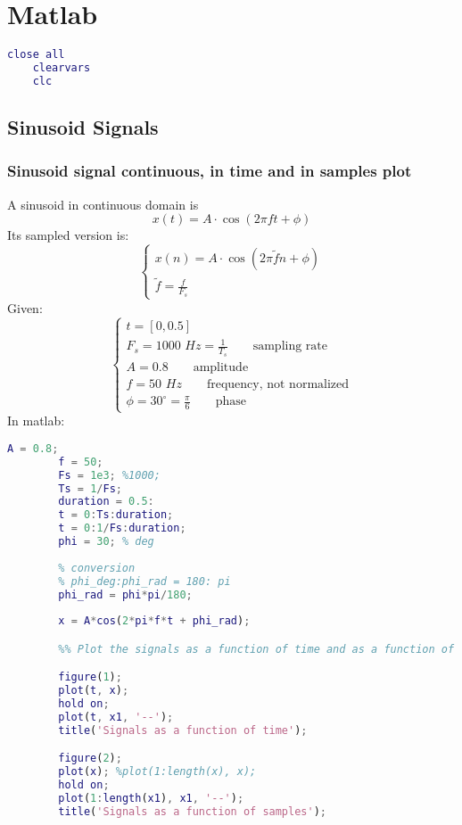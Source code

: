 
\section{Matlab}

\begin{lstlisting}[language=Matlab, escapeinside=`']
    close all
    clearvars
    clc
\end{lstlisting}

\subsection{Sinusoid Signals}

    \subsubsection{Sinusoid signal continuous, in time and in samples plot}
    A sinusoid in continuous domain is
    $$
    x(t)=A\cdot\cos(2\pi ft+\phi)
    $$
    Its sampled version is:
    $$
    \begin{cases}
        x(n)=A\cdot\cos(2\pi \tilde{f}n+\phi)\\
        \tilde{f}=\frac{f}{F_s}
    \end{cases}
    $$
    Given:
    $$
    \begin{cases}
        t=[0,0.5]\\
        F_s=1000\,\,Hz=\frac{1}{T_s}\qquad\text{sampling rate}\\
        A=0.8\qquad\text{amplitude}\\
        f=50\,\,Hz\qquad\text{frequency, not normalized}\\
        \phi=30^\circ=\frac{\pi}{6}\qquad\text{phase}
    \end{cases}
    $$
    In matlab:
    \begin{lstlisting}[language=Matlab, escapeinside=`']
        A = 0.8;
        f = 50;
        Fs = 1e3; %1000;
        Ts = 1/Fs;
        duration = 0.5:
        t = 0:Ts:duration;
        t = 0:1/Fs:duration;
        phi = 30; % deg
        
        % conversion
        % phi_deg:phi_rad = 180: pi
        phi_rad = phi*pi/180;
        
        x = A*cos(2*pi*f*t + phi_rad);

        %% Plot the signals as a function of time and as a function of samples

        figure(1);
        plot(t, x);
        hold on;
        plot(t, x1, '--');
        title('Signals as a function of time');

        figure(2);
        plot(x); %plot(1:length(x), x);
        hold on;
        plot(1:length(x1), x1, '--');
        title('Signals as a function of samples');

    \end{lstlisting}

